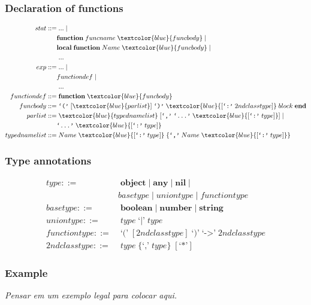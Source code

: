 \documentclass{beamer}
\begin{document}
\begin{frame}
\frametitle{Declaration of functions}
\begin{align*}
stat ::= & \; ... \; |\\
& \textbf{function} \; funcname \; \textcolor{blue}{funcbody} \; |\\
& \textbf{local} \; \textbf{function} \; Name \; \textcolor{blue}{funcbody} \; |\\
& \; ... \\
exp ::= & \; ... \; |\\
& functiondef \; |\\
& \; ...\\
functiondef ::= & \; \textbf{function} \; \textcolor{blue}{funcbody}\\
funcbody ::= & \; \texttt{`('} \; [\textcolor{blue}{parlist}] \; \texttt{`)'} \;
\textcolor{blue}{[\texttt{`:'} \; 2ndclasstype]} \; block \; \textbf{end}\\
parlist ::= & \; \textcolor{blue}{typednamelist} \; [\texttt{`,'} \; \texttt{`...'} \;
\textcolor{blue}{[\texttt{`:'} \; type]}] \; | \;\\
& \texttt{`...'} \; \textcolor{blue}{[\texttt{`:'} \; type]}\\
typednamelist ::= & \; Name \; \textcolor{blue}{[\texttt{`:'} \; type]} \;
\{\texttt{`,'} \; Name \; \textcolor{blue}{[\texttt{`:'} \; type]}\}
\end{align*}
\end{frame}

\begin{frame}
\frametitle{Type annotations}
\begin{align*}
type ::= & \; \textbf{object} \;|\; \textbf{any} \;|\; \textbf{nil} \;|\\
& basetype \;|\; uniontype \;|\; functiontype\\
basetype ::= & \; \textbf{boolean} \;|\; \textbf{number} \;|\; \textbf{string}\\
uniontype ::= & \; type \;\texttt{`|'}\; type\\
functiontype ::= & \; \texttt{`('} \; [2ndclasstype] \; \texttt{`)'} \;
\texttt{`->'} \; 2ndclasstype\\
2ndclasstype ::= & \; type \; \{\texttt{`,'} \; type\} \; [\texttt{`*'}]
\end{align*}
\end{frame}

\begin{frame}
\frametitle{Example}
\textit{Pensar em um exemplo legal para colocar aqui.}
\end{frame}
\end{document}
